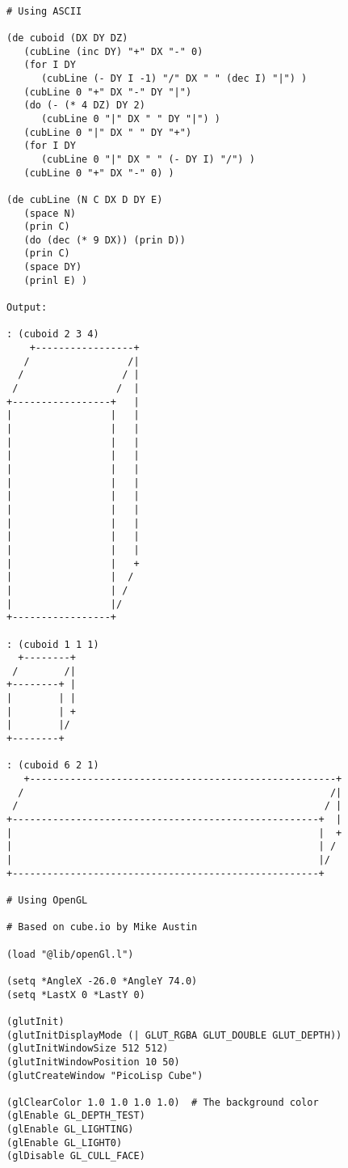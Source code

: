 \begin{verbatim}

# Using ASCII

(de cuboid (DX DY DZ)
   (cubLine (inc DY) "+" DX "-" 0)
   (for I DY
      (cubLine (- DY I -1) "/" DX " " (dec I) "|") )
   (cubLine 0 "+" DX "-" DY "|")
   (do (- (* 4 DZ) DY 2)
      (cubLine 0 "|" DX " " DY "|") )
   (cubLine 0 "|" DX " " DY "+")
   (for I DY
      (cubLine 0 "|" DX " " (- DY I) "/") )
   (cubLine 0 "+" DX "-" 0) )

(de cubLine (N C DX D DY E)
   (space N)
   (prin C)
   (do (dec (* 9 DX)) (prin D))
   (prin C)
   (space DY)
   (prinl E) )

Output:

: (cuboid 2 3 4)
    +-----------------+
   /                 /|
  /                 / |
 /                 /  |
+-----------------+   |
|                 |   |
|                 |   |
|                 |   |
|                 |   |
|                 |   |
|                 |   |
|                 |   |
|                 |   |
|                 |   |
|                 |   |
|                 |   |
|                 |   +
|                 |  /
|                 | /
|                 |/
+-----------------+

: (cuboid 1 1 1)
  +--------+
 /        /|
+--------+ |
|        | |
|        | +
|        |/
+--------+

: (cuboid 6 2 1)
   +-----------------------------------------------------+
  /                                                     /|
 /                                                     / |
+-----------------------------------------------------+  |
|                                                     |  +
|                                                     | /
|                                                     |/
+-----------------------------------------------------+

# Using OpenGL

# Based on cube.io by Mike Austin

(load "@lib/openGl.l")

(setq *AngleX -26.0 *AngleY 74.0)
(setq *LastX 0 *LastY 0)

(glutInit)
(glutInitDisplayMode (| GLUT_RGBA GLUT_DOUBLE GLUT_DEPTH))
(glutInitWindowSize 512 512)
(glutInitWindowPosition 10 50)
(glutCreateWindow "PicoLisp Cube")

(glClearColor 1.0 1.0 1.0 1.0)	# The background color
(glEnable GL_DEPTH_TEST)
(glEnable GL_LIGHTING)
(glEnable GL_LIGHT0)
(glDisable GL_CULL_FACE)


\end{verbatim}
